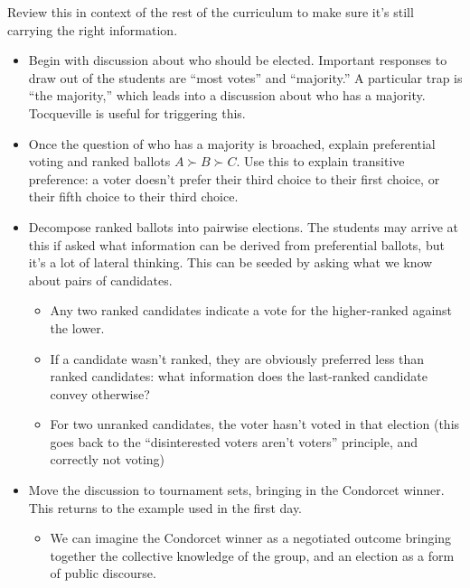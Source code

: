 \begin{todo}
    Review this in context of the rest of the curriculum to make sure it's still carrying the right information.
\end{todo}
\begin{itemize}
    \item Begin with discussion about who should be elected.  Important responses to draw out of the students are ``most votes'' and ``majority.''  A particular trap is ``the majority,'' which leads into a discussion about who has a majority.  Tocqueville is useful for triggering this.

    \item Once the question of who has a majority is broached, explain preferential voting and ranked ballots $A\succ B\succ C$.  Use this to explain transitive preference:  a voter doesn't prefer their third choice to their first choice, or their fifth choice to their third choice.

    \item Decompose ranked ballots into pairwise elections.  The students may arrive at this if asked what information can be derived from preferential ballots, but it's a lot of lateral thinking.  This can be seeded by asking what we know about pairs of candidates.
    \begin{itemize}
        \item Any two ranked candidates indicate a vote for the higher-ranked against the lower.

        \item If a candidate wasn't ranked, they are obviously preferred less than ranked candidates:  what information does the last-ranked candidate convey otherwise?

        \item For two unranked candidates, the voter hasn't voted in that election (this goes back to the ``disinterested voters aren't voters'' principle, and correctly not voting)
    \end{itemize}

    \item Move the discussion to tournament sets, bringing in the Condorcet winner.  This returns to the example used in the first day.
    \begin{itemize}
        \item We can imagine the Condorcet winner as a negotiated outcome bringing together the collective knowledge of the group, and an election as a form of public discourse.


\end{itemize}
\end{itemize}
